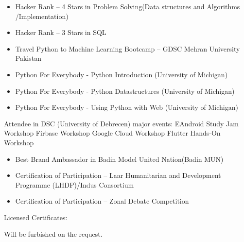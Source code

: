 \documentclass[10pt,a4paper,ragged2e,withhyper]{altacv}
\begin{document}
\begin{paracol}{2}
\begin{itemize}
\item Hacker Rank -- 4 Stars in Problem Solving(Data structures and Algorithms /Implementation)
\item Hacker Rank -- 3 Stars in SQL
\item Travel Python to Machine Learning Bootcamp -- GDSC Mehran University Pakistan
\item Python For Everybody - Python Introduction (University of Michigan)
\item Python For Everybody - Python Datastructures (University of Michigan)
\item Python For Everybody - Using Python with Web (University of Michigan)
\end{itemize}
\begin{outline}
\1 Attendee in DSC (University of Debrecen) major events:
\2 EAndroid Study Jam Workshop
\2 Firbase Workshop
\2 Google Cloud Workshop
\2 Flutter Hands-On Workshop
\end{outline}         
	 
\begin{itemize}
\item Best Brand Ambassador in Badin Model United Nation(Badin MUN)
\item      Certification of Participation – Laar Humanitarian and Development Programme (LHDP)/Indus Consortium
\item      Certification of Participation – Zonal Debate Competition 
\end{itemize}
Licensed Certificates:

\divider

Will be furbished on the request.









\end{paracol}
\end{document}
